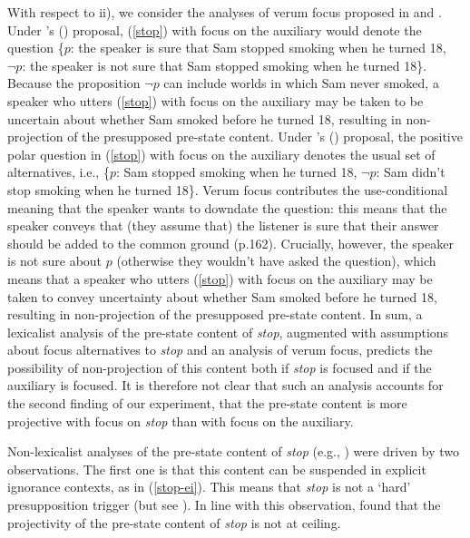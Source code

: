 \documentclass[a4paper,12pt]{article}
\newcommand{\6}{\mbox{$[\hspace*{-.6mm}[$}}
\newcommand{\9}{\mbox{$]\hspace*{-.6mm}]$}}
\newcommand{\citetpos}[1]{\citeauthor{#1}'s (\citeyear{#1})}
\begin{document}
With respect to ii), we consider the analyses of verum focus proposed in \citealt{romero-han2004} and \citealt{gutzmann-miro2011}. Under \citetpos{romero-han2004} proposal, (\ref{stop}) with focus on the auxiliary would denote the question \{$p$: the speaker is sure that Sam stopped smoking when he turned 18, $\neg p$: the speaker is not sure that Sam stopped smoking when he turned 18\}. Because the proposition $\neg p$ can include worlds in which Sam never smoked, a speaker who utters (\ref{stop}) with focus on the auxiliary may be taken to be uncertain about whether Sam smoked before he turned 18, resulting in non-projection of the presupposed pre-state content. Under \citetpos{gutzmann-miro2011} proposal, the positive polar question in (\ref{stop}) with focus on the auxiliary denotes the usual set of alternatives, i.e., \{$p$: Sam stopped smoking when he turned 18, $\neg$$p$: Sam didn't stop smoking when he turned 18\}. Verum focus contributes the use-conditional meaning that the speaker wants to downdate the question: this means that the speaker conveys that (they assume that) the listener is sure that their answer should be added to the common ground (p.162).  Crucially, however, the speaker is not sure about $p$ (otherwise they wouldn't have asked the question), which means that a speaker who utters (\ref{stop}) with focus on the auxiliary may be taken to convey uncertainty about whether Sam smoked before he turned 18, resulting in non-projection of the presupposed pre-state content. In sum, a lexicalist analysis of the pre-state content of {\em stop}, augmented with assumptions about focus alternatives to {\em stop} and an analysis of verum focus, predicts the possibility of non-projection of this content both if {\em stop} is focused and if the auxiliary is focused. It is therefore not clear that such an analysis accounts for the second finding of our experiment, that the pre-state content is more projective with focus on {\em stop} than with focus on the auxiliary.

Non-lexicalist analyses of the pre-state content of {\em stop} (e.g., \citealt{abusch02,abusch10,abrusan2011,abrusan2016,romoli2011,romoli2015,brst-ar}) were driven by two observations. The first one is that this content can be suspended in explicit ignorance contexts, as in (\ref{stop-ei}). This means that {\em stop} is not a `hard' presupposition trigger (but see \citealt{abrusan2016}). In line with this observation, \citealt{tbd-variability} found that the projectivity of the pre-state content of {\em stop} is not at ceiling.
\end{document}
